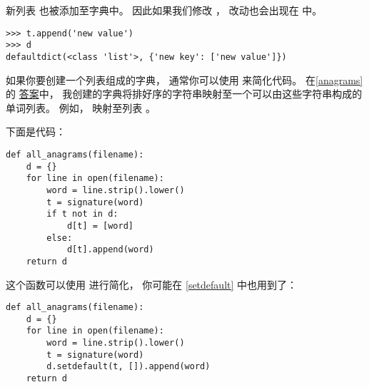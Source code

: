 
新列表  也被添加至字典中。
因此如果我们修改  ， 改动也会出现在  中。

\begin{lstlisting}
>>> t.append('new value')
>>> d
defaultdict(<class 'list'>, {'new key': ['new value']})
\end{lstlisting}


如果你要创建一个列表组成的字典， 通常你可以使用  来简化代码。
在\ref{anagrams} 的 \href{http://thinkpython2.com/code/anagram_sets.py}{答案}中， 我创建的字典将排好序的字符串映射至一个可以由这些字符串构成的单词列表。
例如， 映射至列表 。


下面是代码：

\begin{lstlisting}
def all_anagrams(filename):
    d = {}
    for line in open(filename):
        word = line.strip().lower()
        t = signature(word)
        if t not in d:
            d[t] = [word]
        else:
            d[t].append(word)
    return d
\end{lstlisting}


这个函数可以使用  进行简化， 你可能在 \ref{setdefault} 中也用到了：

\begin{lstlisting}
def all_anagrams(filename):
    d = {}
    for line in open(filename):
        word = line.strip().lower()
        t = signature(word)
        d.setdefault(t, []).append(word)
    return d
\end{lstlisting}



